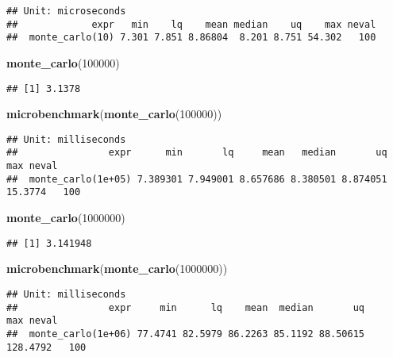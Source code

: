 \documentclass[
]{article}
\newenvironment{Shaded}{\begin{snugshade}}{\end{snugshade}}
\newcommand{\DecValTok}[1]{\textcolor[rgb]{0.00,0.00,0.81}{#1}}
\newcommand{\KeywordTok}[1]{\textcolor[rgb]{0.13,0.29,0.53}{\textbf{#1}}}
\newcommand{\NormalTok}[1]{#1}
\begin{document}
\begin{verbatim}
## Unit: microseconds
##             expr   min    lq    mean median    uq    max neval
##  monte_carlo(10) 7.301 7.851 8.86804  8.201 8.751 54.302   100
\end{verbatim}

\begin{Shaded}
\begin{Highlighting}[]
\KeywordTok{monte\_carlo}\NormalTok{(}\DecValTok{100000}\NormalTok{)}
\end{Highlighting}
\end{Shaded}

\begin{verbatim}
## [1] 3.1378
\end{verbatim}

\begin{Shaded}
\begin{Highlighting}[]
\KeywordTok{microbenchmark}\NormalTok{(}\KeywordTok{monte\_carlo}\NormalTok{(}\DecValTok{100000}\NormalTok{))}
\end{Highlighting}
\end{Shaded}

\begin{verbatim}
## Unit: milliseconds
##                expr      min       lq     mean   median       uq     max neval
##  monte_carlo(1e+05) 7.389301 7.949001 8.657686 8.380501 8.874051 15.3774   100
\end{verbatim}

\begin{Shaded}
\begin{Highlighting}[]
\KeywordTok{monte\_carlo}\NormalTok{(}\DecValTok{1000000}\NormalTok{)}
\end{Highlighting}
\end{Shaded}

\begin{verbatim}
## [1] 3.141948
\end{verbatim}

\begin{Shaded}
\begin{Highlighting}[]
\KeywordTok{microbenchmark}\NormalTok{(}\KeywordTok{monte\_carlo}\NormalTok{(}\DecValTok{1000000}\NormalTok{))}
\end{Highlighting}
\end{Shaded}

\begin{verbatim}
## Unit: milliseconds
##                expr     min      lq    mean  median       uq      max neval
##  monte_carlo(1e+06) 77.4741 82.5979 86.2263 85.1192 88.50615 128.4792   100
\end{verbatim}
\end{document}
